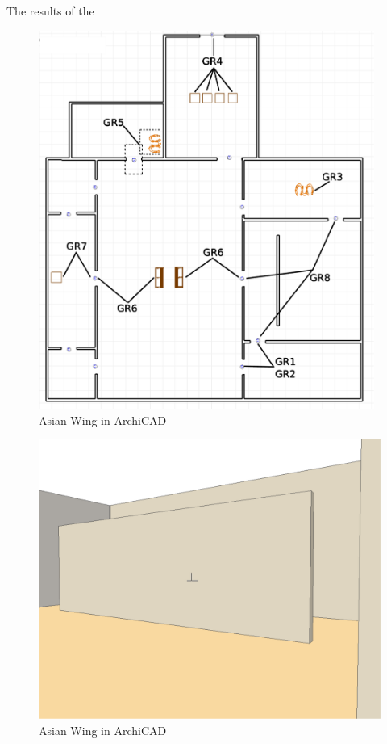\documentclass[12pt]{ucthesis}
\begin{document}
The results of the 
\begin{figure}[h]
\centering
\includegraphics[width=110mm]{museum-floor-plan-reqs-crop2}
\caption{Asian Wing in ArchiCAD}
\label{art museum in archiCAD}
\end{figure}

\begin{figure}[h]
\centering
\includegraphics[width=120mm]{coninuity-req-view}
\caption{Asian Wing in ArchiCAD}
\label{art museum in archiCAD}
\end{figure}
\end{document}
